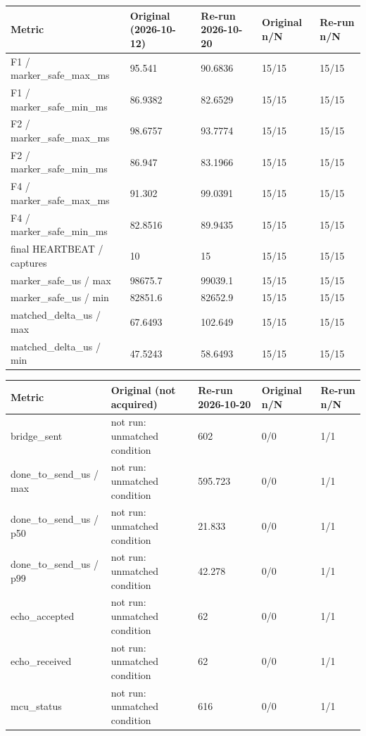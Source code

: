 \begin{tabular}{@{}lllll@{}}
\toprule
Metric & Original (2026-10-12) & Re-run 2026-10-20 & Original n/N & Re-run n/N \\
\midrule
F1 / marker\_safe\_max\_ms & 95.541 & 90.6836 & 15/15 & 15/15 \\
F1 / marker\_safe\_min\_ms & 86.9382 & 82.6529 & 15/15 & 15/15 \\
F2 / marker\_safe\_max\_ms & 98.6757 & 93.7774 & 15/15 & 15/15 \\
F2 / marker\_safe\_min\_ms & 86.947 & 83.1966 & 15/15 & 15/15 \\
F4 / marker\_safe\_max\_ms & 91.302 & 99.0391 & 15/15 & 15/15 \\
F4 / marker\_safe\_min\_ms & 82.8516 & 89.9435 & 15/15 & 15/15 \\
final HEARTBEAT / captures & 10 & 15 & 15/15 & 15/15 \\
marker\_safe\_us / max & 98675.7 & 99039.1 & 15/15 & 15/15 \\
marker\_safe\_us / min & 82851.6 & 82652.9 & 15/15 & 15/15 \\
matched\_delta\_us / max & 67.6493 & 102.649 & 15/15 & 15/15 \\
matched\_delta\_us / min & 47.5243 & 58.6493 & 15/15 & 15/15 \\
\bottomrule
\end{tabular}

\begin{tabular}{@{}lllll@{}}
\toprule
Metric & Original (not acquired) & Re-run 2026-10-20 & Original n/N & Re-run n/N \\
\midrule
bridge\_sent & not run: unmatched condition & 602 & 0/0 & 1/1 \\
done\_to\_send\_us / max & not run: unmatched condition & 595.723 & 0/0 & 1/1 \\
done\_to\_send\_us / p50 & not run: unmatched condition & 21.833 & 0/0 & 1/1 \\
done\_to\_send\_us / p99 & not run: unmatched condition & 42.278 & 0/0 & 1/1 \\
echo\_accepted & not run: unmatched condition & 62 & 0/0 & 1/1 \\
echo\_received & not run: unmatched condition & 62 & 0/0 & 1/1 \\
mcu\_status & not run: unmatched condition & 616 & 0/0 & 1/1 \\
\bottomrule
\end{tabular}


